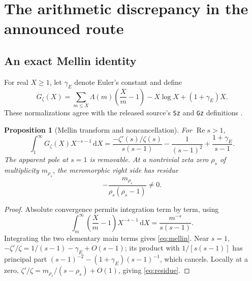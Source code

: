 \documentclass[11pt,letterpaper]{article}
\newtheorem{proposition}[theorem]{Proposition}
\theoremstyle{definition}
\theoremstyle{remark}
\newcommand{\dd}{\,\mathrm d}
\newcommand{\Rea}{\operatorname{Re}}
\numberwithin{equation}{section}
\begin{document}
\section{The arithmetic discrepancy in the announced route}

\subsection{An exact Mellin identity}
For real $X\ge1$, let $\gamma_E$ denote Euler's constant and define
\begin{equation}\label{eq:G}
 G_\zeta(X)=\sum_{m\le X}\Lambda(m)\left(\frac Xm-1\right)
             -X\log X+(1+\gamma_E)X.
\end{equation}
These normalizations agree with the released source's \texttt{Sz} and \texttt{Gz} definitions \cite{externalG}.

\begin{proposition}[Mellin transform and noncancellation]\label{prop:mellin}
For $\Rea s>1$,
\begin{equation}\label{eq:mellin}
 \int_1^\infty G_\zeta(X)X^{-s-1}\dd X
 =\frac{-\zeta'(s)/\zeta(s)}{s(s-1)}
  -\frac1{(s-1)^2}+\frac{1+\gamma_E}{s-1}.
\end{equation}
The apparent pole at $s=1$ is removable. At a nontrivial zeta zero $\rho_s$ of multiplicity $m_{\rho_s}$, the meromorphic right side has residue
\begin{equation}\label{eq:residue}
 -\frac{m_{\rho_s}}{\rho_s(\rho_s-1)}\ne0.
\end{equation}
\end{proposition}
\begin{proof}
Absolute convergence permits integration term by term, using
\[
 \int_m^\infty\left(\frac Xm-1\right)X^{-s-1}\dd X
 =\frac{m^{-s}}{s(s-1)}.
\]
Integrating the two elementary main terms gives \eqref{eq:mellin}. Near $s=1$, $-\zeta'/\zeta=1/(s-1)-\gamma_E+O(s-1)$; its product with $1/[s(s-1)]$ has principal part $(s-1)^{-2}-(1+\gamma_E)(s-1)^{-1}$, which cancels. Locally at a zero, $\zeta'/\zeta=m_{\rho_s}/(s-\rho_s)+O(1)$, giving \eqref{eq:residue}.
\end{proof}
\end{document}
